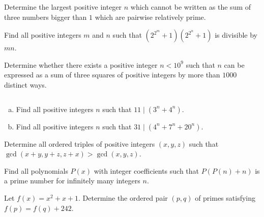 \begin{problem}
	Determine the largest positive integer $n$ which cannot be written as the sum of three numbers bigger than $1$ which are pairwise relatively prime. %
\end{problem}

\begin{problem}
	Find all positive integers $m$ and $n$ such that $\left(2^{2^m}+1\right)\left(2^{2^n}+1\right)$ is divisible by $mn$.
\end{problem}

\begin{problem}
	Determine whether there exists a positive integer $n<10^9$ such that $n$ can be expressed as a sum of three squares of positive integers by more than $1000$ distinct ways.
\end{problem}

\begin{problem}
	$ $
	\begin{enumerate}[(a)]
		\item Find all positive integers $n$ such that $11\mid (3^n + 4^n)$.
		\item Find all positive integers $n$ such that $31\mid (4^n + 7^n + 20^n)$.
	\end{enumerate}
\end{problem}

\begin{problem}
	Determine all ordered triples of positive integers $(x, y, z)$ such that $\gcd(x+y, y+z, z+x) > \gcd(x, y, z)$. %
\end{problem}

\begin{problem}
	Find all polynomials $P(x)$ with integer coefficients such that $P(P(n) + n)$ is a prime number for infinitely many integers $n$. %
\end{problem}

\begin{problem}
	Let $f(x) = x^2 + x + 1$. Determine the ordered pair $(p,q)$ of primes satisfying $f(p) = f(q) + 242$. %
\end{problem}

